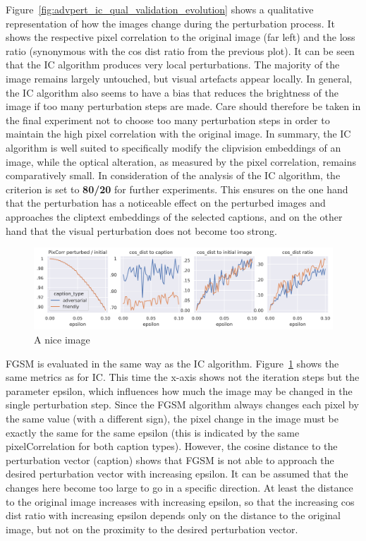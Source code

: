 Figure~\ref{fig:advpert_ic_qual_validation_evolution} shows a qualitative representation of how the images change during the perturbation process. It shows the respective pixel correlation to the original image (far left) and the loss ratio (synonymous with the cos dist ratio from the previous plot). It can be seen that the IC algorithm produces very local perturbations. The majority of the image remains largely untouched, but visual artefacts appear locally. In general, the IC algorithm also seems to have a bias that reduces the brightness of the image if too many perturbation steps are made. Care should therefore be taken in the final experiment not to choose too many perturbation steps in order to maintain the high pixel correlation with the original image. In summary, the IC algorithm is well suited to specifically modify the clipvision embeddings of an image, while the optical alteration, as measured by the pixel correlation, remains comparatively small. In consideration of the analysis of the IC algorithm, the criterion is set to \textbf{80/20} for further experiments. This ensures on the one hand that the perturbation has a noticeable effect on the perturbed images and approaches the cliptext embeddings of the selected captions, and on the other hand that the visual perturbation does not become too strong. 


\begin{figure}[ht]
    \centering
    \includegraphics[width=1\textwidth]{plots/advpert_validation_fgsm_loss_curves.png}
    \caption{A nice image}\label{fig:advpert_validation_fgsm_loss_curves}
\end{figure}

FGSM is evaluated in the same way as the IC algorithm. Figure~\ref{fig:advpert_validation_fgsm_loss_curves} shows the same metrics as for IC. This time the x-axis shows not the iteration steps but the parameter epsilon, which influences how much the image may be changed in the single perturbation step. Since the FGSM algorithm always changes each pixel by the same value (with a different sign), the pixel change in the image must be exactly the same for the same epsilon (this is indicated by the same pixelCorrelation for both caption types). However, the cosine distance to the perturbation vector (caption) shows that FGSM is not able to approach the desired perturbation vector with increasing epsilon. It can be assumed that the changes here become too large to go in a specific direction. At least the distance to the original image increases with increasing epsilon, so that the increasing cos dist ratio with increasing epsilon depends only on the distance to the original image, but not on the proximity to the desired perturbation vector. 

